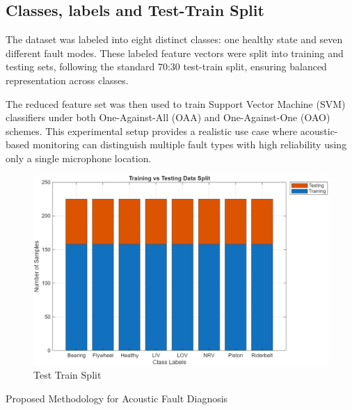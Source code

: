 \documentclass[12pt,a4paper]{article}
\begin{document}
\begin{multicols}{2}
\subsection{Classes, labels and Test-Train Split}

The dataset was labeled into eight distinct classes: one healthy state and seven different fault modes. These labeled feature vectors were split into training and testing sets, following the standard 70:30 test-train split, ensuring balanced representation across classes. 

The reduced feature set was then used to train Support Vector Machine (SVM) classifiers under both One-Against-All (OAA) and One-Against-One (OAO) schemes. This experimental setup provides a realistic use case where acoustic-based monitoring can distinguish multiple fault types with high reliability using only a single microphone location.


\begin{figure}[H]
    \centering
    \includegraphics[width=1\linewidth]{Diagrams/split.png}
    \caption{Test Train Split}
    \label{fig:split}
\end{figure}
\begin{algorithm}[H]
\caption{Proposed Methodology for Acoustic Fault Diagnosis}
\label{alg:pipeline}

\end{algorithm}


\end{multicols}
\end{document}
